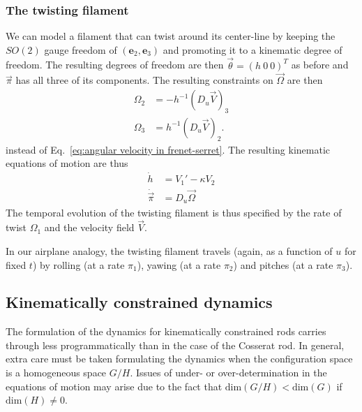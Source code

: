 
\subsubsection*{The twisting filament} \label{sec:twisting filament}

We can model a filament that can twist around its center-line by keeping the $SO(2)$ gauge freedom of $(\mathbf{e}_2, \mathbf{e}_3)$ and promoting it to a kinematic degree of freedom. The resulting degrees of freedom are then $\vec{\theta} = (h\ 0\ 0)^T$ as before and $\vec{\pi}$ has all three of its components. The resulting constraints on $\vec{\Omega}$ are then
\begin{subequations} \label{eq:angular velocity for twisting filament}
\begin{align}
\Omega_2 & = - h^{-1} (D_u \vec{V})_3 \\
\Omega_3 & = h^{-1} (D_u \vec{V})_2.
\end{align}
\end{subequations}
instead of Eq.~\ref{eq:angular velocity in frenet-serret}. The resulting kinematic equations of motion are thus
\begin{subequations} \label{eq:twisting filament kinematic equtions of motion}
\begin{align}
\dot{h} & = V_1' - \kappa V_2 \\
\dot{\vec{\pi}} & = D_u \vec{\Omega}
\end{align}
\end{subequations}
The temporal evolution of the twisting filament is thus specified by the rate of twist $\Omega_1$ and the velocity field $\vec{V}$.

In our airplane analogy, the twisting filament travels (again, as a function of $u$ for fixed $t$) by rolling (at a rate $\pi_1$), yawing (at a rate $\pi_2$) and pitches (at a rate $\pi_3$).

\subsection{Kinematically constrained dynamics} \label{sec:Kinematically constrained dynamics (cosserat rod)}

The formulation of the dynamics for kinematically constrained rods carries through less programmatically than in the case of the Cosserat rod. In general, extra care must be taken formulating the dynamics when the configuration space is a homogeneous space $G / H$. Issues of under- or over-determination in the equations of motion may arise due to the fact that $\text{dim}(G/H) < \text{dim}(G)$ if $\text{dim}(H) \neq 0$.

